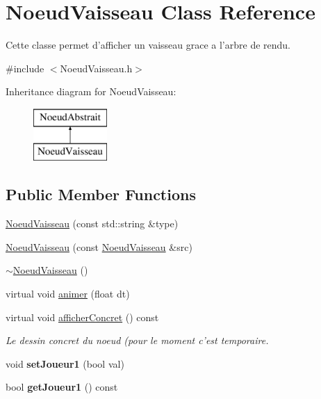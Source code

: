 \hypertarget{class_noeud_vaisseau}{\section{Noeud\-Vaisseau Class Reference}
\label{class_noeud_vaisseau}
}


Cette classe permet d'afficher un vaisseau grace a l'arbre de rendu.  




{\ttfamily \#include $<$Noeud\-Vaisseau.\-h$>$}

Inheritance diagram for Noeud\-Vaisseau\-:\begin{figure}[H]
\begin{center}
\leavevmode
\includegraphics[height=2.000000cm]{class_noeud_vaisseau}
\end{center}
\end{figure}
\subsection*{Public Member Functions}
\begin{DoxyCompactItemize}
\item 
\hyperlink{class_noeud_vaisseau_a5b772aa4f6424fa19e072c2522192b59}{Noeud\-Vaisseau} (const std\-::string \&type)
\item 
\hyperlink{class_noeud_vaisseau_aa45a235d6467858a9b59df04dc4aaf22}{Noeud\-Vaisseau} (const \hyperlink{class_noeud_vaisseau}{Noeud\-Vaisseau} \&src)
\item 
\hyperlink{class_noeud_vaisseau_a3d40bc09ebbc6a9639903cbd39df6cb3}{$\sim$\-Noeud\-Vaisseau} ()
\item 
virtual void \hyperlink{class_noeud_vaisseau_ad5421fd22f086186ec172cc0ec82ae3a}{animer} (float dt)
\item 
virtual void \hyperlink{class_noeud_vaisseau_a74af850f9d984cd99b86b46664eb3d74}{afficher\-Concret} () const 
\begin{DoxyCompactList}\small\item\em Le dessin concret du noeud (pour le moment c'est temporaire. \end{DoxyCompactList}\item 
\hypertarget{class_noeud_vaisseau_ab842bcf24f9553cdc7deea03ebb4eac5}{void {\bfseries set\-Joueur1} (bool val)}\label{class_noeud_vaisseau_ab842bcf24f9553cdc7deea03ebb4eac5}

\item 
\hypertarget{class_noeud_vaisseau_a95995ec949f7cb34cef018f967cff09b}{bool {\bfseries get\-Joueur1} () const }\label{class_noeud_vaisseau_a95995ec949f7cb34cef018f967cff09b}

\end{DoxyCompactItemize}
